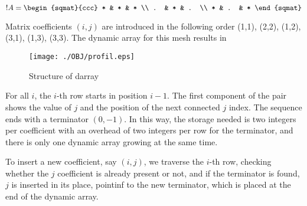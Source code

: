 
\begin{equation} 
  !A = 
\begin{sqmat}{ccc}
      * & * & * \\    
      . & * & . \\    
      * & . & * 
\end{sqmat} 
\end{equation}

Matrix coefficients $(i,j)$ are introduced in the following order (1,1),
(2,2), (1,2), (3,1), (1,3), (3,3).  The dynamic array for this mesh
results in

\begin{figure*}[ht]
\centerline{\texttt{[image: ./OBJ/profil.eps]}}
\caption{Structure of darray}
\label{fg:profil}
\end{figure*}

For all $i$, the $i$-th row starts in position $i-1$. The first
component of the pair shows the value of $j$ and the position of the
next connected $j$ index. The sequence ends with a terminator
$(0,-1)$. In this way, the storage needed is two integers per
coefficient with an overhead of two integers per row for the
terminator, and there is only one dynamic array growing at the same
time. 

To insert a new coefficient, say $(i,j)$, we traverse the $i$-th row,
checking whether the $j$ coefficient is already present or not, and if
the terminator is found, $j$ is inserted in its place, pointinf to the
new terminator, which is placed at the end of the dynamic array.

